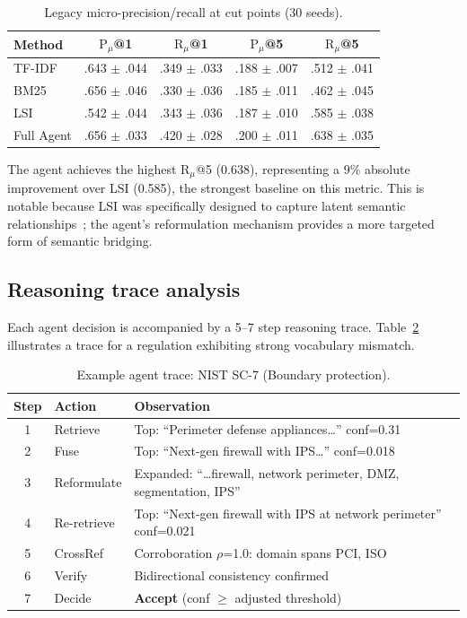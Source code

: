 \documentclass[a4paper,fleqn]{cas-sc}
\begin{document}
\begin{table}[t]
\caption{Legacy micro-precision/recall at cut points (30 seeds).}
\label{tab:legacy}
\centering
\small
\begin{tabular}{@{}lcccc@{}}
\toprule
Method & $\text{P}_\mu$@1 & $\text{R}_\mu$@1 & $\text{P}_\mu$@5 & $\text{R}_\mu$@5 \\
\midrule
TF-IDF        & .643 $\pm$ .044 & .349 $\pm$ .033 & .188 $\pm$ .007 & .512 $\pm$ .041 \\
BM25          & .656 $\pm$ .046 & .330 $\pm$ .036 & .185 $\pm$ .011 & .462 $\pm$ .045 \\
LSI           & .542 $\pm$ .044 & .343 $\pm$ .036 & .187 $\pm$ .010 & .585 $\pm$ .038 \\
\midrule
Full Agent    & .656 $\pm$ .033 & .420 $\pm$ .028 & .200 $\pm$ .011 & .638 $\pm$ .035 \\
\bottomrule
\end{tabular}
\end{table}

The agent achieves the highest $\text{R}_\mu$@5 (0.638), representing a 9\% absolute improvement over LSI (0.585), the strongest baseline on this metric.
This is notable because LSI was specifically designed to capture latent semantic relationships~\citep{MarcusMaletic2003}; the agent's reformulation mechanism provides a more targeted form of semantic bridging.


\subsection{Reasoning trace analysis}

Each agent decision is accompanied by a 5--7 step reasoning trace.
Table~\ref{tab:trace} illustrates a trace for a regulation exhibiting strong vocabulary mismatch.

\begin{table}[t]
\caption{Example agent trace: NIST SC-7 (Boundary protection).}
\label{tab:trace}
\centering
\small
\begin{tabular}{@{}clp{6.5cm}@{}}
\toprule
Step & Action & Observation \\
\midrule
1 & Retrieve & Top: ``Perimeter defense appliances\ldots'' conf=0.31 \\
2 & Fuse & Top: ``Next-gen firewall with IPS\ldots'' conf=0.018 \\
3 & Reformulate & Expanded: ``\ldots firewall, network perimeter, DMZ, segmentation, IPS'' \\
4 & Re-retrieve & Top: ``Next-gen firewall with IPS at network perimeter'' conf=0.021 \\
5 & CrossRef & Corroboration $\rho$=1.0: domain spans PCI, ISO \\
6 & Verify & Bidirectional consistency confirmed \\
7 & Decide & \textbf{Accept} (conf $\geq$ adjusted threshold) \\
\bottomrule
\end{tabular}
\end{table}
\end{document}
